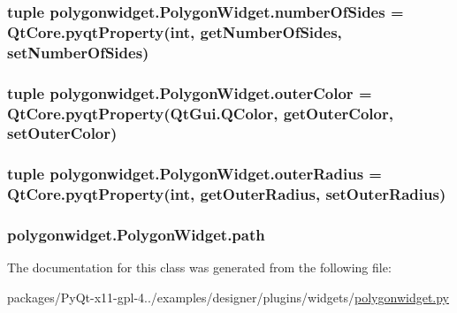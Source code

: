 \subsubsection[{number\+Of\+Sides}]{\setlength{\rightskip}{0pt plus 5cm}tuple polygonwidget.\+Polygon\+Widget.\+number\+Of\+Sides = Qt\+Core.\+pyqt\+Property(int, {\bf get\+Number\+Of\+Sides}, {\bf set\+Number\+Of\+Sides})\hspace{0.3cm}{\ttfamily [static]}}\label{classpolygonwidget_1_1PolygonWidget_ace03a3ab04a542407e305e669ac04bc0}
\hypertarget{classpolygonwidget_1_1PolygonWidget_af7fc9239d0100c6817e44ae27d6f5235}{}
\subsubsection[{outer\+Color}]{\setlength{\rightskip}{0pt plus 5cm}tuple polygonwidget.\+Polygon\+Widget.\+outer\+Color = Qt\+Core.\+pyqt\+Property(Qt\+Gui.\+Q\+Color, {\bf get\+Outer\+Color}, {\bf set\+Outer\+Color})\hspace{0.3cm}{\ttfamily [static]}}\label{classpolygonwidget_1_1PolygonWidget_af7fc9239d0100c6817e44ae27d6f5235}
\hypertarget{classpolygonwidget_1_1PolygonWidget_a3c2be1c2b210680692414e9043803d29}{}
\subsubsection[{outer\+Radius}]{\setlength{\rightskip}{0pt plus 5cm}tuple polygonwidget.\+Polygon\+Widget.\+outer\+Radius = Qt\+Core.\+pyqt\+Property(int, {\bf get\+Outer\+Radius}, {\bf set\+Outer\+Radius})\hspace{0.3cm}{\ttfamily [static]}}\label{classpolygonwidget_1_1PolygonWidget_a3c2be1c2b210680692414e9043803d29}
\hypertarget{classpolygonwidget_1_1PolygonWidget_a471baa3a28f133005bf9a00c22cbaa4d}{}
\subsubsection[{path}]{\setlength{\rightskip}{0pt plus 5cm}polygonwidget.\+Polygon\+Widget.\+path}\label{classpolygonwidget_1_1PolygonWidget_a471baa3a28f133005bf9a00c22cbaa4d}


The documentation for this class was generated from the following file\+:\begin{DoxyCompactItemize}
\item 
packages/\+Py\+Qt-\/x11-\/gpl-\/4../examples/designer/plugins/widgets/\hyperlink{polygonwidget_8py}{polygonwidget.\+py}\end{DoxyCompactItemize}
